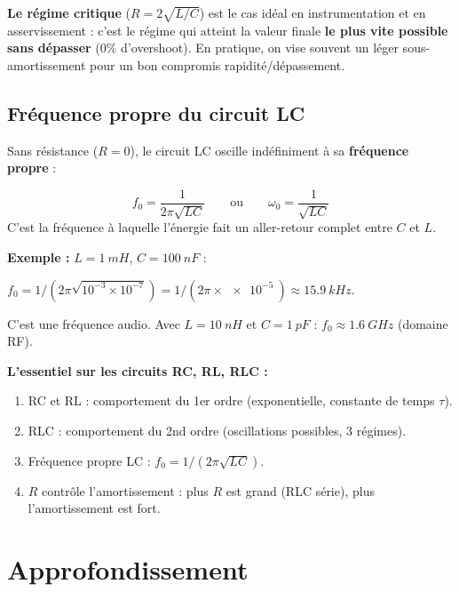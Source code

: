 \documentclass[12pt,a4paper,twoside]{book}
\begin{document}
\begin{attention}
\textbf{Le régime critique} ($R = 2\sqrt{L/C}$) est le cas idéal en instrumentation et en asservissement : c'est le régime qui atteint la valeur finale \textbf{le plus vite possible sans dépasser} ($0\%$ d'overshoot). En pratique, on vise souvent un léger sous-amortissement pour un bon compromis rapidité/dépassement.
\end{attention}

\subsection{Fréquence propre du circuit LC}

Sans résistance ($R = 0$), le circuit LC oscille indéfiniment à sa \textbf{fréquence propre} :

\begin{formule}
\[
\boxed{f_0 = \frac{1}{2\pi\sqrt{LC}}} \qquad \text{ou} \qquad \boxed{\omega_0 = \frac{1}{\sqrt{LC}}}
\]
C'est la fréquence à laquelle l'énergie fait un aller-retour complet entre $C$ et $L$.
\end{formule}

\begin{pratique}
\textbf{Exemple :} $L = \SI{1}{mH}$, $C = \SI{100}{nF}$ :

$f_0 = 1/(2\pi\sqrt{10^{-3}\times10^{-7}}) = 1/(2\pi\times\SI{e-5}{}) \approx \SI{15.9}{kHz}$.

C'est une fréquence audio. Avec $L = \SI{10}{nH}$ et $C = \SI{1}{pF}$ : $f_0 \approx \SI{1.6}{GHz}$ (domaine RF).
\end{pratique}

\begin{retenir}
\textbf{L'essentiel sur les circuits RC, RL, RLC :}
\begin{enumerate}[nosep]
\item RC et RL : comportement du 1er ordre (exponentielle, constante de temps $\tau$).
\item RLC : comportement du 2nd ordre (oscillations possibles, 3 régimes).
\item Fréquence propre LC : $f_0 = 1/(2\pi\sqrt{LC})$.
\item $R$ contrôle l'amortissement : plus $R$ est grand (RLC série), plus l'amortissement est fort.
\end{enumerate}
\end{retenir}

\section{Approfondissement}
\end{document}
